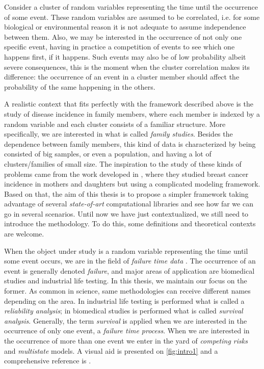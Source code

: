 Consider a cluster of random variables representing the time until the
occurrence of some event. These random variables are assumed to be
correlated, i.e. for some biological or environmental reason it is not
adequate to assume independence between them. Also, we may be interested
in the occurrence of not only one specific event, having in practice a
competition of events to see which one happens first, if it
happens. Such events may also be of low probability albeit severe
consequences, this is the moment when the cluster correlation makes its
difference: the occurrence of an event in a cluster member should affect
the probability of the same happening in the others.

A realistic context that fits perfectly with the framework described
above is the study of disease incidence in family members, where each
member is indexed by a random variable and each cluster consists of a
familiar structure. More specifically, we are interested in what is
called \textit{family studies}. Besides the dependence between family
members, this kind of data is characterized by being consisted of big
samples, or even a population, and having a lot of clusters/families of
small size. The inspiration to the study of these kinds of problems came
from the work developed in , where they studied
breast cancer incidence in mothers and daughters but using a complicated
modeling framework. Based on that, the aim of this thesis is to propose
a simpler framework taking advantage of several \textit{state-of-art}
computational libraries and see how far we can go in several
scenarios. Until now we have just contextualized, we still need to
introduce the methodology. To do this, some definitions and theoretical
contexts are welcome.

When the object under study is a random variable representing the time
until some event occurs, we are in the field of \textit{failure time
data} \cite{kalb&prentice}. The occurrence of an event is generally
denoted \textit{failure}, and major areas of application are biomedical
studies and industrial life testing. In this thesis, we maintain our
focus on the former. As common in science, same methodologies can
receive different names depending on the area. In industrial life
testing is performed what is called a \textit{reliability analysis}; in
biomedical studies is performed what is called
\textit{survival analysis}. Generally, the term \textit{survival} is
applied when we are interested in the occurrence of only one event, a
\textit{failure time process}. When we are interested in the occurrence
of more than one event we enter in the yard of \textit{competing risks}
and \textit{multistate} models. A visual aid is presented on
\autoref{fig:intro1} and a comprehensive reference is
.

